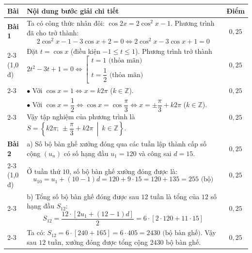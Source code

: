 \documentclass[12pt, a4paper]{article}
\begin{document}
\begin{center}
\small
\begin{tabularx}{\textwidth}{|p{1.2cm}|X|c|}
\hline
\textbf{Bài} & \textbf{Nội dung bước giải chi tiết} & \textbf{Điểm} \\ \hline
\textbf{Bài 1} & Ta có công thức nhân đôi: $\cos 2x = 2\cos^2 x - 1$. \newline
Phương trình đã cho trở thành:
$$2\cos^2 x - 1 - 3\cos x + 2 = 0 \iff 2\cos^2 x - 3\cos x + 1 = 0$$ & $0{,}25$ \\ \cline{2-3}
(1,0 đ) & Đặt $t = \cos x$ (điều kiện $-1 \le t \le 1$). \newline
Phương trình trở thành $2t^2 - 3t + 1 = 0 \iff \left[\begin{array}{l} t = 1 \text{ (thỏa mãn)} \\ t = \dfrac{1}{2} \text{ (thỏa mãn)} \end{array}\right.$ & $0{,}25$ \\ \cline{2-3}
& $\bullet$ Với $\cos x = 1 \iff x = k2\pi$ ($k \in \mathbb{Z}$). & $0{,}25$ \\ \cline{2-3}
& $\bullet$ Với $\cos x = \dfrac{1}{2} \iff \cos x = \cos \dfrac{\pi}{3} \iff x = \pm \dfrac{\pi}{3} + k2\pi$ ($k \in \mathbb{Z}$). \newline
Vậy tập nghiệm của phương trình là $S = \left\{k2\pi; \, \pm \dfrac{\pi}{3} + k2\pi \ \middle|\ k \in \mathbb{Z}\right\}$. & $0{,}25$ \\ \hline

\textbf{Bài 2} & a) Số bộ bàn ghế xưởng đóng qua các tuần lập thành cấp số cộng $(u_n)$ có số hạng đầu $u_1 = 120$ và công sai $d = 15$. & $0{,}25$ \\ \cline{2-3}
(1,0 đ) & Ở tuần thứ $10$, số bộ bàn ghế xưởng đóng được là:
$$u_{10} = u_1 + (10 - 1)d = 120 + 9 \cdot 15 = 120 + 135 = 255 \text{ (bộ)}$$ & $0{,}25$ \\ \cline{2-3}
& b) Tổng số bộ bàn ghế đóng được sau $12$ tuần là tổng của $12$ số hạng đầu $S_{12}$:
$$S_{12} = \dfrac{12 \cdot [2u_1 + (12 - 1)d]}{2} = 6 \cdot [2 \cdot 120 + 11 \cdot 15]$$ & $0{,}25$ \\ \cline{2-3}
& Ta có: $S_{12} = 6 \cdot [240 + 165] = 6 \cdot 405 = 2430 \text{ (bộ bàn ghế)}$. \newline
Vậy sau $12$ tuần, xưởng đóng được tổng cộng $2430$ bộ bàn ghế. & $0{,}25$ \\ \hline


\end{tabularx}
\end{center}
\end{document}
